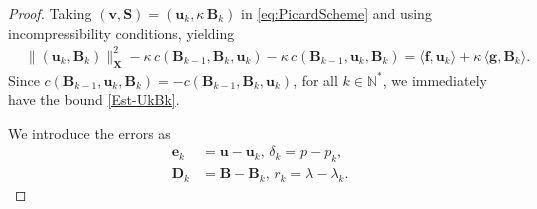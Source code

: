 \documentclass[3p]{elsarticle}
\def\V#1{\mathbf{#1}}
\def\VX{\mathbf{X}}
\begin{document}
\begin{proof}
Taking $(\V{v},\V{S})= (\V{u}_k,\kappa\, \V{B}_k)$ in \eqref{eq:PicardScheme} and using incompressibility conditions, yielding 
\begin{align*}
& \|(\V{u}_k,\V{B}_k)\|^2_\VX 
- \kappa\,c(\V{B}_{k-1},\V{B}_{k},\V{u}_k)
- \kappa\,c(\V{B}_{k-1},\V{u}_{k},\V{B}_k)
= \langle \V{f}, \V{u}_k \rangle
+ \kappa\,\langle \V{g}, \V{B}_k \rangle.
\end{align*}
Since $\displaystyle c(\V{B}_{k-1}, \V{u}_{k}, \V{B}_k ) = - c(\V{B}_{k-1},\V{B}_{k},\V{u}_k)$,
for all $k \in \mathbb{N}^*$, we immediately have the bound \eqref{Est-UkBk}.

We introduce the errors as 
\begin{equation}
    \label{eq:Picard0}
    \begin{aligned}
\V{e}_k & =\V{u}-\V{u}_k, \, \delta_k = p-p_k, \\
\V{D}_k & =\V{B}-\V{B}_k, \, r_k = \lambda-\lambda_k.
    \end{aligned}
\end{equation}


\end{proof}
\end{document}
